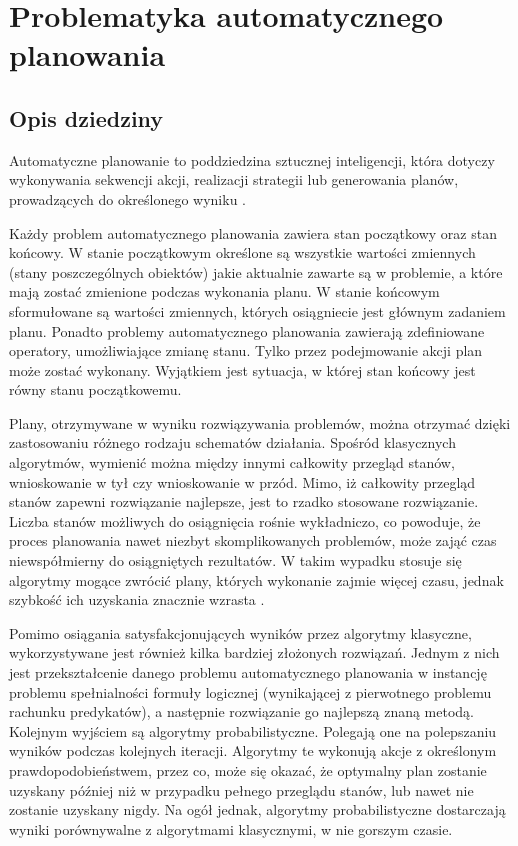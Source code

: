 \chapter{Problematyka automatycznego planowania}
\label{sec:drugi}
 \section{Opis dziedziny}
 \label{sec:opis}
Automatyczne planowanie to poddziedzina sztucznej inteligencji, która dotyczy wykonywania sekwencji akcji, realizacji strategii lub generowania planów, prowadzących do określonego wyniku \cite{planning}.

Każdy problem automatycznego planowania zawiera stan początkowy oraz stan końcowy. W stanie początkowym określone są wszystkie wartości zmiennych (stany poszczególnych obiektów) jakie aktualnie zawarte są w problemie, a które mają zostać zmienione podczas wykonania planu. W stanie końcowym sformułowane są wartości zmiennych, których osiągniecie jest głównym zadaniem planu. Ponadto problemy automatycznego planowania zawierają zdefiniowane operatory, umożliwiające zmianę stanu. Tylko przez podejmowanie akcji plan może zostać wykonany. Wyjątkiem jest sytuacja, w której stan końcowy jest równy stanu początkowemu.

Plany, otrzymywane w wyniku rozwiązywania problemów, można otrzymać dzięki zastosowaniu różnego rodzaju schematów działania. Spośród klasycznych algorytmów, wymienić można między innymi całkowity przegląd stanów, wnioskowanie w tył czy wnioskowanie w przód. Mimo, iż całkowity przegląd stanów zapewni rozwiązanie najlepsze, jest to rzadko stosowane rozwiązanie. Liczba stanów możliwych do osiągnięcia rośnie wykładniczo, co powoduje, że proces planowania nawet niezbyt skomplikowanych problemów, może zająć czas niewspółmierny do osiągniętych rezultatów. W takim wypadku stosuje się algorytmy mogące zwrócić plany, których wykonanie zajmie więcej czasu, jednak szybkość ich uzyskania znacznie wzrasta \cite{fdalgorytm}.

Pomimo osiągania satysfakcjonujących wyników przez algorytmy klasyczne, wykorzystywane jest również kilka bardziej złożonych rozwiązań. Jednym z nich jest przekształcenie danego problemu automatycznego planowania w instancję problemu spełnialności formuły logicznej (wynikającej z pierwotnego problemu rachunku predykatów), a następnie  rozwiązanie go najlepszą znaną metodą. Kolejnym wyjściem są algorytmy probabilistyczne. Polegają one na polepszaniu wyników podczas kolejnych iteracji. Algorytmy te wykonują akcje z określonym prawdopodobieństwem, przez co, może się okazać, że optymalny plan zostanie uzyskany później niż w przypadku pełnego przeglądu stanów, lub nawet nie zostanie uzyskany nigdy. Na ogół jednak, algorytmy probabilistyczne dostarczają wyniki porównywalne z algorytmami klasycznymi, w nie gorszym czasie.

